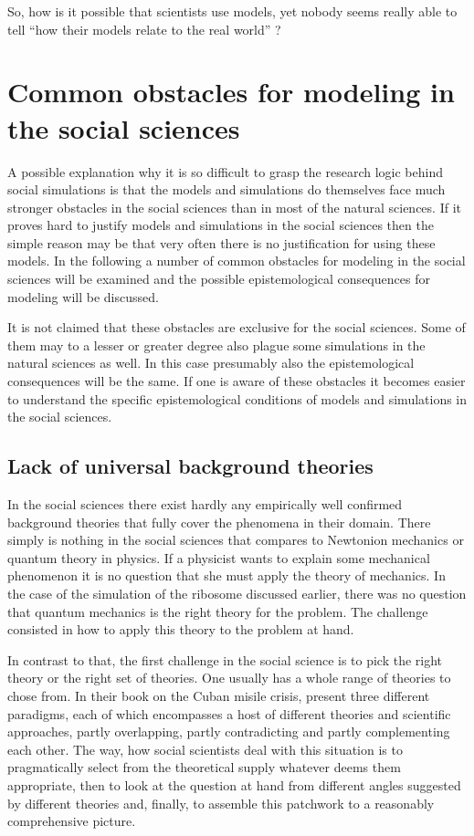 \documentclass[onecollarge]{STJour}
\numberwithin{equation}{section}
\begin{document}
So, how is it possible that scientists use models, yet nobody seems
really able to tell ``how their models relate to the real world''
\cite[p.\ 25]{sugden:2009}?

\section{Common obstacles for modeling in the social sciences}

A possible explanation why it is so difficult to grasp the research logic
behind social simulations is that the models and simulations do
themselves face much stronger obstacles in the social sciences than in
most of the natural sciences. If it proves hard to justify models and
simulations in the social sciences then the simple reason may be that
very often there is no justification for using these models. In the
following a number of common obstacles for modeling in the social
sciences will be examined and the possible epistemological
consequences for modeling will be discussed. 

It is not claimed that these obstacles are
exclusive for the social sciences. Some of them may to a lesser or
greater degree also plague some simulations in the natural sciences as
well. In this case presumably also the epistemological consequences will
be the same. If one is aware of these obstacles it becomes easier to
understand the specific epistemological conditions of models and
simulations in the social sciences. 

\subsection{Lack of universal background theories}

In the social sciences there exist hardly any empirically well confirmed
background theories that fully cover the phenomena in their domain. There
simply is nothing in the social sciences that compares to Newtonion
mechanics or quantum theory in physics. If a physicist wants to explain
some mechanical phenomenon it is no question that she must apply the
theory of mechanics. In the case of the simulation of the ribosome
discussed earlier, there was no question that quantum mechanics is the
right theory for the problem. The challenge consisted in how to apply
this theory to the problem at hand.

In contrast to that, the first challenge in the social science is to pick
the right theory or the right set of theories. One usually has a whole
range of theories to chose from. In their book on the Cuban misile
crisis, \citet[]{allison-zelikow:1999} present three different
paradigms, each of which encompasses a host of different theories and
scientific approaches, partly overlapping, partly contradicting and
partly complementing each other. The way, how
social scientists deal with this situation is to pragmatically select
from the theoretical supply whatever deems them appropriate, then to look
at the question at hand from different angles suggested by different
theories and, finally, to assemble this patchwork to a reasonably
comprehensive picture.
\end{document}
